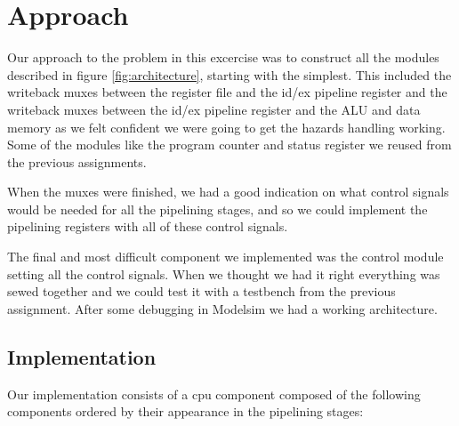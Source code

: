 \documentclass[11pt]{report}
\begin{document}
\section*{Approach}


Our approach to the problem in this excercise was to construct all the 
modules described in figure \ref{fig:architecture}, starting with the simplest.  %
This included the writeback muxes between the register file and the id/ex
pipeline register and the writeback muxes between the id/ex pipeline 
register and the ALU and data memory as we felt confident we were going 
to get the hazards handling working. 
Some of the modules like the program counter and status register 
we reused from the previous assignments.

When the muxes were finished, we had a good indication on what control
signals would be needed for all the pipelining stages, and so we could 
implement the pipelining registers with all of these control signals.

The final and most difficult component we implemented was the control
module setting all the control signals. When we thought we had it right
everything was sewed together and we could test it with a testbench
from the previous assignment. After some debugging in Modelsim we had 
a working architecture.

\subsection*{Implementation}



Our implementation consists of a cpu component composed of
the following components ordered by their appearance 
in the pipelining stages:
	
\end{document}
